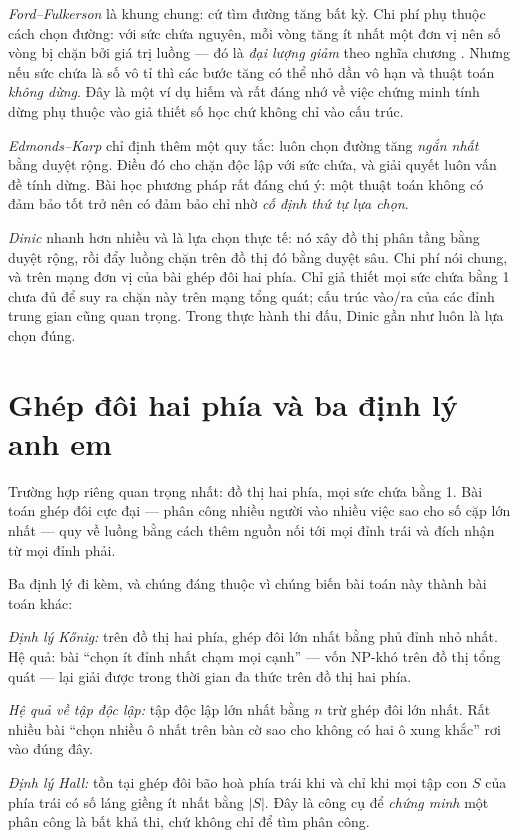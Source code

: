 \documentclass[../../algorithm.tex]{subfiles}
\begin{document}
\emph{Ford--Fulkerson} là khung chung: cứ tìm đường tăng bất kỳ. Chi phí phụ thuộc cách chọn đường: với sức chứa nguyên, mỗi vòng tăng ít nhất một đơn vị nên số vòng bị chặn bởi giá trị luồng --- đó là \emph{đại lượng giảm} theo nghĩa chương . Nhưng nếu sức chứa là số vô tỉ thì các bước tăng có thể nhỏ dần vô hạn và thuật toán \emph{không dừng}. Đây là một ví dụ hiếm và rất đáng nhớ về việc chứng minh tính dừng phụ thuộc vào giả thiết số học chứ không chỉ vào cấu trúc.

\emph{Edmonds--Karp} chỉ định thêm một quy tắc: luôn chọn đường tăng \emph{ngắn nhất} bằng duyệt rộng. Điều đó cho chặn  độc lập với sức chứa, và giải quyết luôn vấn đề tính dừng. Bài học phương pháp rất đáng chú ý: một thuật toán không có đảm bảo tốt trở nên có đảm bảo chỉ nhờ \emph{cố định thứ tự lựa chọn}.

\emph{Dinic} nhanh hơn nhiều và là lựa chọn thực tế: nó xây đồ thị phân tầng bằng duyệt rộng, rồi đẩy luồng chặn trên đồ thị đó bằng duyệt sâu. Chi phí  nói chung, và  trên mạng đơn vị của bài ghép đôi hai phía. Chỉ giả thiết mọi sức chứa bằng 1 chưa đủ để suy ra chặn này trên mạng tổng quát; cấu trúc vào/ra của các đỉnh trung gian cũng quan trọng\cite{kactl}. Trong thực hành thi đấu, Dinic gần như luôn là lựa chọn đúng.

\section{Ghép đôi hai phía và ba định lý anh em}

Trường hợp riêng quan trọng nhất: đồ thị hai phía, mọi sức chứa bằng 1. Bài toán ghép đôi cực đại --- phân công nhiều người vào nhiều việc sao cho số cặp lớn nhất --- quy về luồng bằng cách thêm nguồn nối tới mọi đỉnh trái và đích nhận từ mọi đỉnh phải.

Ba định lý đi kèm, và chúng đáng thuộc vì chúng biến bài toán này thành bài toán khác:

\emph{Định lý Kőnig:} trên đồ thị hai phía, ghép đôi lớn nhất bằng phủ đỉnh nhỏ nhất. Hệ quả: bài ``chọn ít đỉnh nhất chạm mọi cạnh'' --- vốn NP-khó trên đồ thị tổng quát --- lại giải được trong thời gian đa thức trên đồ thị hai phía.

\emph{Hệ quả về tập độc lập:} tập độc lập lớn nhất bằng \(n\) trừ ghép đôi lớn nhất. Rất nhiều bài ``chọn nhiều ô nhất trên bàn cờ sao cho không có hai ô xung khắc'' rơi vào đúng đây.

\emph{Định lý Hall:} tồn tại ghép đôi bão hoà phía trái khi và chỉ khi mọi tập con \(S\) của phía trái có số láng giềng ít nhất bằng \(|S|\). Đây là công cụ để \emph{chứng minh} một phân công là bất khả thi, chứ không chỉ để tìm phân công.
\end{document}
